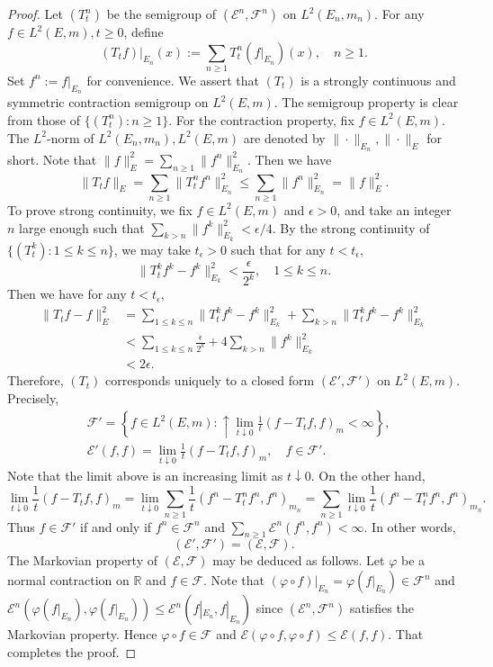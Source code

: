 \documentclass[a4paper]{amsart}
\theoremstyle{definition}
\theoremstyle{remark}
\numberwithin{equation}{section}
\begin{document}
\begin{proof}
Let $(T^n_t)$ be the semigroup of $({{\mathcal{E}}}^n,{{\mathcal{F}}}^n)$ on $L^2(E_n,m_n)$. For any $f\in L^2(E,m), t\geq 0$, define
\begin{equation}\label{EQ2TTF}
(T_tf)|_{E_n}(x):= \sum_{n\geq 1}T^n_t(f|_{E_n})(x), \quad n\geq 1.
\end{equation}
 Set $f^n:=f|_{E_n}$ for convenience. We assert that $(T_t)$ is a strongly continuous and symmetric contraction semigroup on $L^2(E,m)$. The semigroup property is clear from those of $\{(T^n_t):n\geq 1\}$. For the contraction property, fix $f\in L^2(E,m)$. The $L^2$-norm of $L^2(E_n,m_n), L^2(E,m)$ are denoted by $\|\cdot\|_{E_n}, \|\cdot\|_{E}$ for short. Note that $\|f\|_E^2=\sum_{n\geq 1}\|f^n\|_{E_n}^2$. Then we have
\[
	\|T_tf\|_{E}=\sum_{n\geq 1} \|T_t^nf^n\|^2_{E_n}\leq \sum_{n\geq 1}\|f^n\|^2_{E_n}= \|f\|_E^2.
\]
To prove strong continuity, we fix $f\in L^2(E,m)$ and $\epsilon>0$, and take an integer $n$ large enough such that $\sum_{k>n}\|f^k\|_{E_k}^2<\epsilon/4$. By the strong continuity of $\{(T^k_t): 1\leq k\leq n\}$, we may take $t_\epsilon>0$ such that for any $t<t_\epsilon$,
\[
	\|T^k_tf^k-f^k\|^2_{E_k}<\frac{\epsilon}{2^k},\quad 1\leq k\leq n.
\]
Then we have for any $t<t_\epsilon$,
\[
\begin{aligned}
\|T_tf-f\|^2_E&=\sum_{1\leq k\leq n}\|T^k_tf^k-f^k\|^2_{E_k}+\sum_{ k> n}\|T^k_tf^k-f^k\|^2_{E_k} \\
&< \sum_{1\leq k\leq n}\frac{\epsilon}{2^k}+ 4\sum_{k>n}\|f^k\|_{E_k}^2\\
&<2\epsilon.
\end{aligned}\]
Therefore, $(T_t)$ corresponds uniquely to a closed form $({{\mathcal{E}}}',{{\mathcal{F}}}')$ on $L^2(E,m)$. Precisely,
\[
\begin{aligned}
	&{{\mathcal{F}}}'=\left\{f\in L^2(E,m): \uparrow \lim_{t\downarrow 0} \frac{1}{t}(f-T_tf,f)_m<\infty\right\}, \\
	&{{\mathcal{E}}}'(f,f)=\lim_{t\downarrow 0} \frac{1}{t}(f-T_tf,f)_m,\quad f\in {{\mathcal{F}}}'.
	\end{aligned}
\]
Note that the limit above is an increasing limit as $t\downarrow 0$. On the other hand,
\[
\lim_{t\downarrow 0}\frac{1}{t}(f-T_tf,f)_m=\lim_{t\downarrow 0}\sum_{n\geq 1} \frac{1}{t}(f^n-T^n_tf^n,f^n)_{m_n}=\sum_{n\geq 1}\lim_{t\downarrow 0} \frac{1}{t}(f^n-T^n_tf^n,f^n)_{m_n}.
\]
Thus $f\in {{\mathcal{F}}}'$ if and only if $f^n\in {{\mathcal{F}}}^n$ and $\sum_{n\geq 1} {{\mathcal{E}}}^n(f^n,f^n)<\infty$. In other words,
\[
	({{\mathcal{E}}}',{{\mathcal{F}}}')=({{\mathcal{E}}},{{\mathcal{F}}}).
\]
The Markovian property of $({{\mathcal{E}}},{{\mathcal{F}}})$ may be deduced as follows. Let $\varphi$ be a normal contraction on $\mathbb{R}$ and $f\in {{\mathcal{F}}}$. Note that $(\varphi\circ f)|_{E_n}=\varphi(f|_{E_n})\in {{\mathcal{F}}}^n$ and ${{\mathcal{E}}}^n(\varphi(f|_{E_n}), \varphi(f|_{E_n}))\leq {{\mathcal{E}}}^n(f|_{E_n},f|_{E_n})$ since $({{\mathcal{E}}}^n,{{\mathcal{F}}}^n)$ satisfies the Markovian property. Hence $\varphi\circ f\in {{\mathcal{F}}}$ and ${{\mathcal{E}}}(\varphi\circ f, \varphi\circ f)\leq {{\mathcal{E}}}(f,f)$. That completes the proof.
\end{proof}
\end{document}

